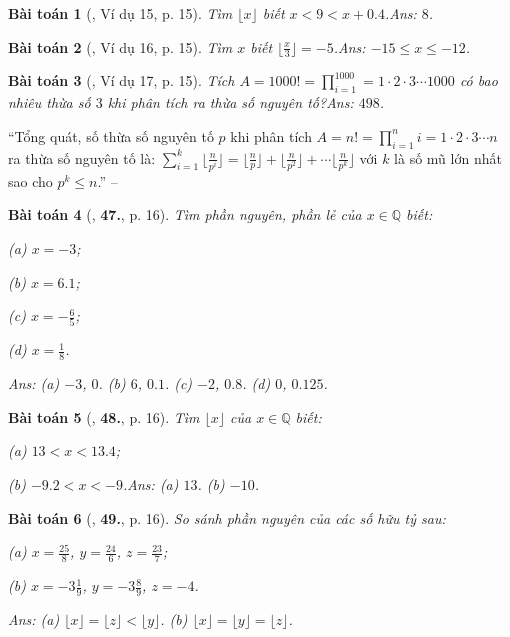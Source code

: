 \documentclass{article}
\numberwithin{equation}{section}
\newtheorem{baitoan}{Bài toán}
\begin{document}
\begin{baitoan}[\cite{Tuyen_Toan_7}, Ví dụ 15, p. 15]
	Tìm $\lfloor x\rfloor$ biết $x < 9 < x + 0.4$.\hfill\textsf{Ans:} $8$.
\end{baitoan}

\begin{baitoan}[\cite{Tuyen_Toan_7}, Ví dụ 16, p. 15]
	Tìm $x$ biết $\lfloor\frac{x}{3}\rfloor = -5$.\hfill\textsf{Ans:} $-15\le x\le-12$.
\end{baitoan}

\begin{baitoan}[\cite{Tuyen_Toan_7}, Ví dụ 17, p. 15]
	Tích $A = 1000! = \prod_{i=1}^{1000} = 1\cdot 2\cdot 3\cdots 1000$ có bao nhiêu thừa số $3$ khi phân tích ra thừa số nguyên tố?\hfill\textsf{Ans:} $498$.
\end{baitoan}
``Tổng quát, số thừa số nguyên tố $p$ khi phân tích $A = n! = \prod_{i=1}^n i = 1\cdot 2\cdot 3\cdots n$ ra thừa số nguyên tố là: $\sum_{i=1}^k \lfloor\frac{n}{p^i}\rfloor = \lfloor\frac{n}{p}\rfloor + \lfloor\frac{n}{p^2}\rfloor + \cdots \lfloor\frac{n}{p^k}\rfloor$ với $k$ là số mũ lớn nhất sao cho $p^k\le n$.'' -- \cite[p. 15]{Tuyen_Toan_7} 

\begin{baitoan}[\cite{Tuyen_Toan_7}, \textbf{47.}, p. 16]
	Tìm phần nguyên, phần lẻ của $x\in\mathbb{Q}$ biết:
	\begin{enumerate*}
		\item[(a)] $x = -3$;
		\item[(b)] $x = 6.1$;
		\item[(c)] $x = -\frac{6}{5}$;
		\item[(d)] $x = \frac{1}{8}$.
	\end{enumerate*}\hfill\textsf{Ans:} (a) $-3$, $0$. (b) $6$, $0.1$. (c) $-2$, $0.8$. (d) $0$, $0.125$.
\end{baitoan}

\begin{baitoan}[\cite{Tuyen_Toan_7}, \textbf{48.}, p. 16]
	Tìm $\lfloor x\rfloor$ của $x\in\mathbb{Q}$ biết:
	\begin{enumerate*}
		\item[(a)] $13 < x < 13.4$;
		\item[(b)] $-9.2 < x < -9$.\hfill\textsf{Ans:} (a) $13$. (b) $-10$.
	\end{enumerate*}
\end{baitoan}

\begin{baitoan}[\cite{Tuyen_Toan_7}, \textbf{49.}, p. 16]
	So sánh phần nguyên của các số hữu tỷ sau:
	\begin{enumerate*}
		\item[(a)] $x = \frac{25}{8}$, $y  = \frac{24}{6}$, $z = \frac{23}{7}$;
		\item[(b)] $x = -3\frac{1}{9}$, $y = -3\frac{8}{9}$, $z = -4$.
	\end{enumerate*}\hfill\textsf{Ans:} (a) $\lfloor x\rfloor = \lfloor z\rfloor < \lfloor y\rfloor$. (b) $\lfloor x\rfloor = \lfloor y\rfloor = \lfloor z\rfloor$.
\end{baitoan}
\end{document}
